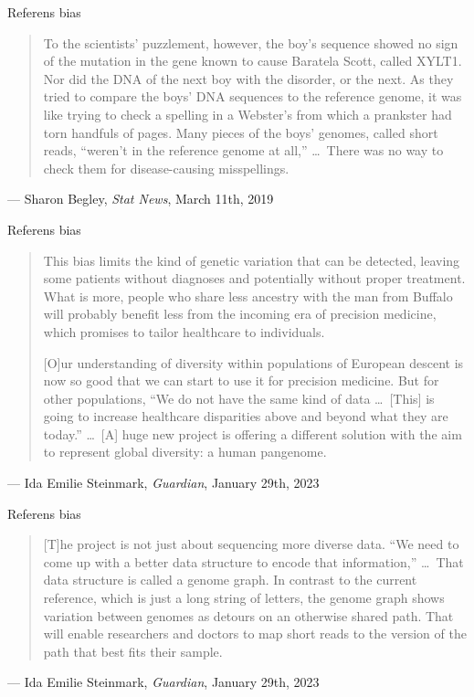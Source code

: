 \documentclass[11pt, aspectratio=169, table]{beamer}
\begin{document}
\begin{frame}{Referens bias}
\small
\begin{quotation}
To the scientists' puzzlement, however, the boy's sequence showed no sign of the mutation in the gene known to 
cause Baratela Scott, called XYLT1. Nor did the DNA of the next boy with the disorder, or the next. As they 
tried to compare the boys' DNA sequences to the reference genome, it was like trying to check a spelling in a 
Webster's from which a prankster had torn handfuls of pages. Many pieces of the boys’ genomes, called short reads,
``weren’t in the reference genome at all,'' \dots\ There was no way to check them for disease-causing misspellings.
\end{quotation}

\hfill --- Sharon Begley, {\it Stat News}, March 11th, 2019
\end{frame}

\begin{frame}{Referens bias}
\small
\begin{quotation}
This bias limits the kind of genetic variation that can be detected, leaving some patients without diagnoses and 
potentially without proper treatment. What is more, people who share less ancestry with the man from Buffalo will 
probably benefit less from the incoming era of precision medicine, which promises to tailor healthcare to individuals.

[O]ur understanding of diversity within populations of European descent is now so good that we can start to use it 
for precision medicine. But for other populations, ``We do not have the same kind of data \dots\ [This] is going to 
increase healthcare disparities above and beyond what they are today.'' \dots\ [A] huge new project is offering a 
different solution with the aim to represent global diversity: a human pangenome.
\end{quotation}

\hfill --- Ida Emilie Steinmark, {\it Guardian}, January 29th, 2023
\end{frame}

\begin{frame}{Referens bias}
\small
\begin{quotation}
[T]he project is not just about sequencing more diverse data. ``We need to come up with a better data structure to 
encode that information,'' \dots\ That data structure is called a genome graph. In contrast to the current reference, 
which is just a long string of letters, the genome graph shows variation between genomes as detours on an otherwise 
shared path. That will enable researchers and doctors to map short reads to the version of the path that best fits their sample.
\end{quotation}

\hfill --- Ida Emilie Steinmark, {\it Guardian}, January 29th, 2023
\end{frame}
\end{document}
